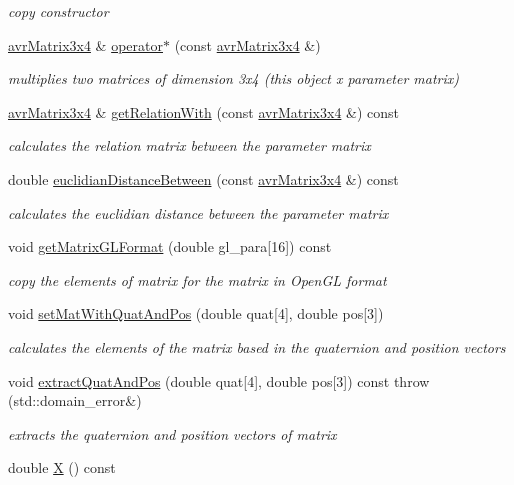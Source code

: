 \begin{DoxyCompactItemize}
\begin{DoxyCompactList}\small\item\em copy constructor \end{DoxyCompactList}\item 
\hyperlink{classavr_matrix3x4}{avr\-Matrix3x4} \& \hyperlink{classavr_matrix3x4_a69695710fa229029aac327a93bf67e28}{operator$\ast$} (const \hyperlink{classavr_matrix3x4}{avr\-Matrix3x4} \&)
\begin{DoxyCompactList}\small\item\em multiplies two matrices of dimension 3x4 (this object x parameter matrix) \end{DoxyCompactList}\item 
\hyperlink{classavr_matrix3x4}{avr\-Matrix3x4} \& \hyperlink{classavr_matrix3x4_af6aeaea8801d27ad4aec3c1fc9aea277}{get\-Relation\-With} (const \hyperlink{classavr_matrix3x4}{avr\-Matrix3x4} \&) const 
\begin{DoxyCompactList}\small\item\em calculates the relation matrix between the parameter matrix \end{DoxyCompactList}\item 
double \hyperlink{classavr_matrix3x4_ac05ea22d8597df4aa2b1f261ec94f8a7}{euclidian\-Distance\-Between} (const \hyperlink{classavr_matrix3x4}{avr\-Matrix3x4} \&) const 
\begin{DoxyCompactList}\small\item\em calculates the euclidian distance between the parameter matrix \end{DoxyCompactList}\item 
void \hyperlink{classavr_matrix3x4_ad03865e565b36b5e60057247216d901e}{get\-Matrix\-G\-L\-Format} (double gl\-\_\-para\mbox{[}16\mbox{]}) const 
\begin{DoxyCompactList}\small\item\em copy the elements of matrix for the matrix in Open\-G\-L format \end{DoxyCompactList}\item 
void \hyperlink{classavr_matrix3x4_a2cace74000dc095ad78c7dca07804a18}{set\-Mat\-With\-Quat\-And\-Pos} (double quat\mbox{[}4\mbox{]}, double pos\mbox{[}3\mbox{]})
\begin{DoxyCompactList}\small\item\em calculates the elements of the matrix based in the quaternion and position vectors \end{DoxyCompactList}\item 
void \hyperlink{classavr_matrix3x4_aa48c0f1da93a4aeb29750e8f2a06d968}{extract\-Quat\-And\-Pos} (double quat\mbox{[}4\mbox{]}, double pos\mbox{[}3\mbox{]}) const   throw (std\-::domain\-\_\-error\&)
\begin{DoxyCompactList}\small\item\em extracts the quaternion and position vectors of matrix \end{DoxyCompactList}\item 
\hypertarget{classavr_matrix3x4_a6af1e8d00de2afc425f86c6c9db7c45a}{double \hyperlink{classavr_matrix3x4_a6af1e8d00de2afc425f86c6c9db7c45a}{X} () const }\label{classavr_matrix3x4_a6af1e8d00de2afc425f86c6c9db7c45a}


\end{DoxyCompactItemize}

